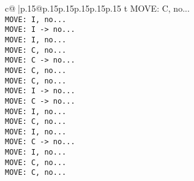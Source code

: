 \documentclass{article}
\begin{document}
{\begin{supertabular}{c@{$\;$}|p{.15\linewidth}@{}p{.15\linewidth}p{.15\linewidth}p{.15\linewidth}p{.15\linewidth}p{.15\linewidth}}
{{{t  MOVE: C, no...\\ \tt  MOVE: I, no...\\ \tt  MOVE: I -> no...\\ \tt  MOVE: I, no...\\ \tt  MOVE: C, no...\\ \tt  MOVE: C -> no...\\ \tt  MOVE: C, no...\\ \tt  MOVE: C, no...\\ \tt  MOVE: I -> no...\\ \tt  MOVE: C -> no...\\ \tt  MOVE: I, no...\\ \tt  MOVE: C, no...\\ \tt  MOVE: I, no...\\ \tt  MOVE: C -> no...\\ \tt  MOVE: I, no...\\ \tt  MOVE: C, no...\\ \tt  MOVE: C, no...\\}}}
\end{supertabular}}
\end{document}
